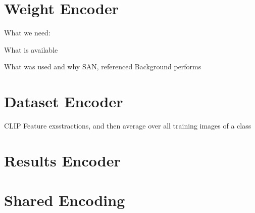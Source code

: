 \section{Weight Encoder}
\label{sec:weight_enc}
What we need:

What is available

What was used and why
SAN, referenced Background performs

\section{Dataset Encoder}
\label{sec:data_enc}

CLIP
Feature exsstractions, and then average over all training images of a class
\section{Results Encoder}
\label{sec:results_enc}
\section{Shared Encoding}
\label{sec:shared_enc}
